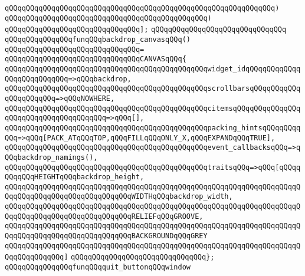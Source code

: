 \verb|qQQqqQQqqQQqqQQqqQQqqQQqqQQqqQQqqQQqqQQqqQQqqQQqqQQqqQQqqQQqqQQq)|\newline
\verb|qQQqqQQqqQQqqQQqqQQqqQQqqQQqqQQqqQQqqQQqqQQqqQQq)|\newline
\verb|qQQqqQQqqQQqqQQqqQQqqQQqqQQqqQQq];|\newline
\verb|qQQqqQQqqQQqqQQqqQQqqQQqqQQqqQQq|\newline
\verb|qQQqqQQqqQQqqQQqfunqQQqbackdrop_canvasqQQq()|\newline
\verb|qQQqqQQqqQQqqQQqqQQqqQQqqQQqqQQq=|\newline
\verb|qQQqqQQqqQQqqQQqqQQqqQQqqQQqqQQqCANVASqQQq{|\newline
\verb|qQQqqQQqqQQqqQQqqQQqqQQqqQQqqQQqqQQqqQQqqQQqqQQqwidget_idqQQqqQQqqQQqqQQqqQQqqQQqqQQq=>qQQqbackdrop,|\newline
\verb|qQQqqQQqqQQqqQQqqQQqqQQqqQQqqQQqqQQqqQQqqQQqqQQqscrollbarsqQQqqQQqqQQqqQQqqQQqqQQq=>qQQqNOWHERE,|\newline
\verb|qQQqqQQqqQQqqQQqqQQqqQQqqQQqqQQqqQQqqQQqqQQqqQQqcitemsqQQqqQQqqQQqqQQqqQQqqQQqqQQqqQQqqQQqqQQq=>qQQq[],|\newline
\verb|qQQqqQQqqQQqqQQqqQQqqQQqqQQqqQQqqQQqqQQqqQQqqQQqpacking_hintsqQQqqQQqqQQq=>qQQq[PACK_ATqQQqTOP,qQQqFILLqQQqONLY_X,qQQqEXPANDqQQqTRUE],|\newline
\verb|qQQqqQQqqQQqqQQqqQQqqQQqqQQqqQQqqQQqqQQqqQQqqQQqevent_callbacksqQQq=>qQQqbackdrop_namings(),|\newline
\verb|qQQqqQQqqQQqqQQqqQQqqQQqqQQqqQQqqQQqqQQqqQQqqQQqtraitsqQQq=>qQQq[qQQqqQQqqQQqHEIGHTqQQqbackdrop_height,|\newline
\verb|qQQqqQQqqQQqqQQqqQQqqQQqqQQqqQQqqQQqqQQqqQQqqQQqqQQqqQQqqQQqqQQqqQQqqQQqqQQqqQQqqQQqqQQqqQQqqQQqqQQqWIDTHqQQqbackdrop_width,|\newline
\verb|qQQqqQQqqQQqqQQqqQQqqQQqqQQqqQQqqQQqqQQqqQQqqQQqqQQqqQQqqQQqqQQqqQQqqQQqqQQqqQQqqQQqqQQqqQQqqQQqqQQqRELIEFqQQqGROOVE,|\newline
\verb|qQQqqQQqqQQqqQQqqQQqqQQqqQQqqQQqqQQqqQQqqQQqqQQqqQQqqQQqqQQqqQQqqQQqqQQqqQQqqQQqqQQqqQQqqQQqqQQqqQQqBACKGROUNDqQQqGREY|\newline
\verb|qQQqqQQqqQQqqQQqqQQqqQQqqQQqqQQqqQQqqQQqqQQqqQQqqQQqqQQqqQQqqQQqqQQqqQQqqQQqqQQqqQQq]|\newline
\verb|qQQqqQQqqQQqqQQqqQQqqQQqqQQqqQQq};|\newline
\newline
\newline
\verb|qQQqqQQqqQQqqQQqfunqQQqquit_buttonqQQqwindow|\newline
